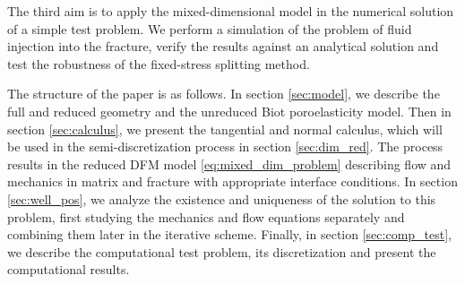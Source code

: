 \documentclass[a4paper]{article}
\numberwithin{equation}{section}
\begin{document}
The third aim is to apply the mixed-dimensional model in the numerical solution of a simple test problem.
We perform a simulation of the problem of fluid injection into the fracture, verify the results against an analytical solution and test the robustness of the fixed-stress splitting method.

The structure of the paper is as follows.
In section \ref{sec:model}, we describe the full and reduced geometry and the unreduced Biot poroelasticity model.
Then in section \ref{sec:calculus}, we present the tangential and normal calculus, which will be used in the semi-discretization process in section \ref{sec:dim_red}.
The process results in the reduced DFM model \eqref{eq:mixed_dim_problem} describing  flow and mechanics in matrix and fracture with appropriate interface conditions.
In section \ref{sec:well_pos}, we analyze the existence and uniqueness of the solution to this problem, first studying the mechanics and flow equations separately and combining them later in the iterative scheme.
Finally, in section \ref{sec:comp_test}, we describe the computational test problem, its discretization and present the computational results.
\end{document}
